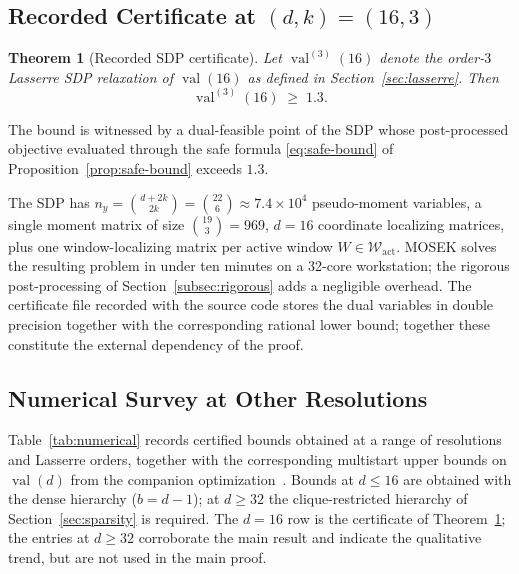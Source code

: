 \documentclass[11pt, letterpaper]{article}
\theoremstyle{paperplain}
\newtheorem{theorem}{Theorem}[section]
\theoremstyle{paperdef}
\newcommand{\val}{\operatorname{val}}
\begin{document}
\subsection{Recorded Certificate at \texorpdfstring{$(d,k)=(16,3)$}{(d,k)=(16,3)}}

\begin{theorem}[Recorded SDP certificate]
\label{thm:certificate}
Let $\val^{(3)}(16)$ denote the order-$3$ Lasserre SDP relaxation of
$\val(16)$ as defined in Section~\ref{sec:lasserre}.  Then
\[
  \val^{(3)}(16) \;\ge\; 1.3.
\]
\end{theorem}

The bound is witnessed by a dual-feasible point of the SDP whose
post-processed objective evaluated through the safe formula
\eqref{eq:safe-bound} of Proposition~\ref{prop:safe-bound} exceeds
$1.3$.

The SDP has
$n_y=\binom{d+2k}{2k}=\binom{22}{6}\approx 7.4\times 10^4$
pseudo-moment variables, a single moment matrix of size
$\binom{19}{3}=969$, $d=16$ coordinate localizing matrices, plus one
window-localizing matrix per active window
$W\in\mathcal{W}_{\mathrm{act}}$.  MOSEK solves the resulting problem
in under ten minutes on a 32-core workstation; the rigorous
post-processing of Section~\ref{subsec:rigorous} adds a negligible
overhead.  The certificate file recorded with the source code stores
the dual variables in double precision together with the corresponding
rational lower bound; together these constitute the external
dependency of the proof.

\subsection{Numerical Survey at Other Resolutions}\label{subsec:numerical-survey}

Table~\ref{tab:numerical} records certified bounds obtained at a
range of resolutions and Lasserre orders, together with the
corresponding multistart upper bounds on $\val(d)$ from the companion
optimization~\cite{BajajCS2026}.  Bounds at $d\le 16$ are obtained
with the dense hierarchy ($b=d-1$); at $d\ge 32$ the clique-restricted
hierarchy of Section~\ref{sec:sparsity} is required.  The $d=16$ row
is the certificate of Theorem~\ref{thm:certificate}; the entries at
$d\ge 32$ corroborate the main result and indicate the qualitative
trend, but are not used in the main proof.
\end{document}
